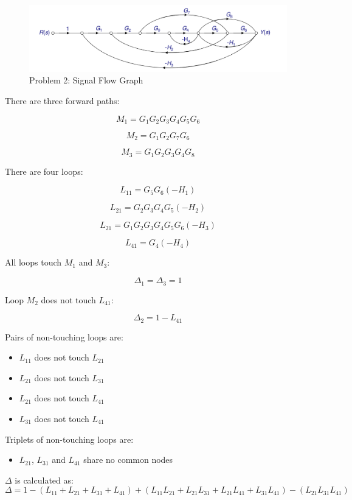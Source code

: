 \documentclass[12pt, letterpaper]{../assignment}
\begin{document}
\begin{figure}[H]
    \centering
    \includegraphics[scale=0.5]{figures/Problem_2_sfd.png}
    \caption{Problem 2: Signal Flow Graph}
    \label{Fig:sfg}
\end{figure}

There are three forward paths:

$$ M_1 = G_1 G_2 G_3 G_4 G_5 G_6 $$

$$ M_2 = G_1 G_2 G_7 G_6 $$

$$ M_3 = G_1 G_2 G_3 G_4 G_8 $$

There are four loops:

$$ L_{11} = G_5 G_6 (-H_1) $$

$$ L_{21} = G_2 G_3 G_4 G_5 (-H_2) $$

$$ L_{21} = G_1 G_2 G_3 G_4 G_5 G_6 (-H_3) $$

$$ L_{41} = G_4 (-H_4) $$

All loops touch $M_1$ and $M_3$:

$$ \Delta_1 = \Delta_3  = 1 $$

Loop $M_2$ does not touch $L_{41}$:

$$ \Delta_2 = 1 - L_{41} $$

Pairs of non-touching loops are:

\begin{itemize}
    \item $L_{11}$ does not touch $L_{21}$
    \item $L_{21}$ does not touch $L_{31}$
    \item $L_{21}$ does not touch $L_{41}$
    \item $L_{31}$ does not touch $L_{41}$
\end{itemize}

Triplets of non-touching loops are:

\begin{itemize}
    \item $L_{21}$, $L_{31}$ and $L_{41}$ share no common nodes
\end{itemize}

$\Delta$ is calculated as:
$$ \Delta = 1 - (L_{11}+L_{21}+L_{31}+L_{41}) + (L_{11}L_{21} + L_{21}L_{31} + L_{21}L_{41} + L_{31}L_{41} ) - (L_{21} L_{31} L_{41})$$
\end{document}
